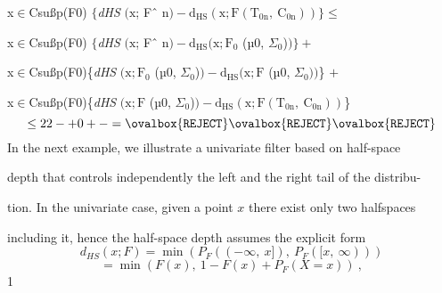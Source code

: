 \documentclass[a4paper,12pt]{article}
\begin{document}
x$\in$Csußp(F0) $\{${\it dHS} $(\mathrm{x}$; Fˆ $\mathrm{n})-\mathrm{d}_{\mathrm{H}\mathrm{S}}(\mathrm{x};\mathrm{F}(\mathrm{T}_{0\mathrm{n}},\ \mathrm{C}_{0\mathrm{n}}))\}\leq$

x$\in$Csußp(F0) $\{${\it dHS} $(\mathrm{x}$; Fˆ $\mathrm{n})-\mathrm{d}_{\mathrm{H}\mathrm{S}}(\mathrm{x};\mathrm{F}_{0}$ (µ0, $\Sigma_{0}$)$)\}+$

x$\in$Csußp(F0)\{{\it dHS} $(\mathrm{x};\mathrm{F}_{0}$ (µ0, $\Sigma_{0}$)$)-\mathrm{d}_{\mathrm{H}\mathrm{S}}(\mathrm{x};\mathrm{F}$ (µ0, $\Sigma_{0}))$\} $+$

x$\in$Csußp(F0)\{{\it dHS} $(\mathrm{x};\mathrm{F}$ (µ0, $\Sigma_{0}$)$)-\mathrm{d}_{\mathrm{H}\mathrm{S}}(\mathrm{x};\mathrm{F}(\mathrm{T}_{0\mathrm{n}},\ \mathrm{C}_{0\mathrm{n}}))$\}
$$
\leq 22-+0+-=\ovalbox{\tt\small REJECT}\ovalbox{\tt\small REJECT}\ovalbox{\tt\small REJECT}
$$
In the next example, we illustrate a univariate filter based on half-space

depth that controls independently the left and the right tail of the distribu-

tion. In the univariate case, given a point $x$ there exist only two halfspaces

including it, hence the half-space depth assumes the explicit form
$$
d_{HS}(x;F)=\min(P_{F}((-\infty,\ x]),\ P_{F}([x,\ \infty)))
$$
$$
=\min(F(x),\ 1-F(x)+P_{F}(X=x))\ ,
$$
1
\end{document}
